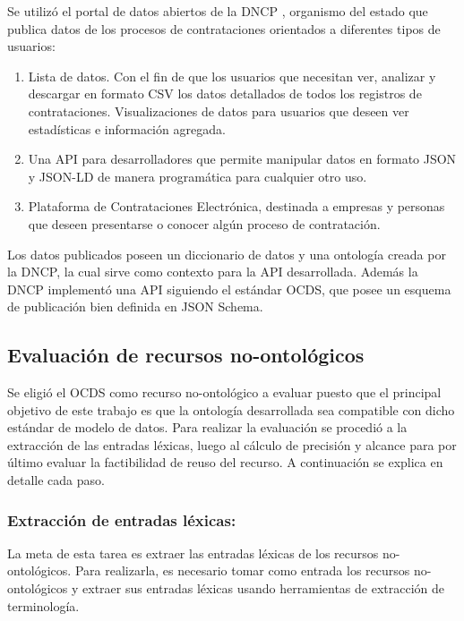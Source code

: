 Se utilizó el portal de datos abiertos de la DNCP \cite{DatosAbiDNCP:online}, organismo del estado que publica datos de los procesos de contrataciones orientados a diferentes tipos de usuarios:


\begin{enumerate}
    \item Lista de datos. Con el fin de que los usuarios que necesitan ver, analizar y descargar en formato CSV los datos detallados de todos los registros de contrataciones.
    Visualizaciones de datos para usuarios que deseen ver estadísticas e información agregada.
    \item Una API para desarrolladores que permite manipular datos en formato JSON y JSON-LD de manera programática para cualquier otro uso.
    \item Plataforma de Contrataciones Electrónica, destinada a empresas y personas que deseen presentarse o conocer algún proceso de contratación.

   
    
    
\end{enumerate}

Los datos publicados poseen un diccionario de datos y una ontología creada por la DNCP, la cual sirve como contexto para la API desarrollada. Además la DNCP implementó una API siguiendo el estándar OCDS, que posee un esquema de publicación bien definida en JSON Schema.

\subsection{Evaluación de recursos no-ontológicos}
Se eligió el OCDS como recurso no-ontológico a evaluar puesto que el principal objetivo de este trabajo es que la ontología desarrollada sea compatible con dicho estándar de modelo de datos. Para realizar la evaluación se procedió a la extracción de las entradas léxicas, luego al cálculo de precisión y alcance para por último evaluar la factibilidad de reuso del recurso.  A continuación se explica en detalle cada paso.

\subsubsection{Extracción de entradas léxicas:}
La meta de esta tarea es extraer las entradas léxicas de los recursos no-ontológicos. Para realizarla, es necesario tomar como entrada los recursos no-ontológicos y extraer sus entradas léxicas usando herramientas de extracción de terminología.	
			
